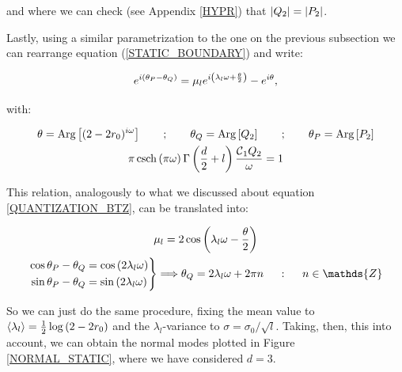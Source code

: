 \documentclass[11pt,a4paper]{article}
\begin{document}
{{\noindent and where we can check (see Appendix \ref{HYPR}) that $\left| Q_2 \right|=\left| P_2 \right|$. }

Lastly, using a similar parametrization to the one on the previous subsection we can rearrange equation (\ref{STATIC_BOUNDARY}) and write:

\begin{equation}
    e^{i(\theta_P-\theta_Q)} = \mu_l e^{i\left(\lambda_l\omega + \frac{\theta}{2}\right)}-e^{i\theta},
\end{equation}

{\noindent with:}

\begin{equation}
    \begin{gathered}
        \theta=\text{Arg}\left[(2-2r_0)^{i\omega}\right] ~~~~~~;~~~~~~ \theta_Q=\text{Arg}\left[Q_2\right] ~~~~~~;~~~~~~ \theta_P=\text{Arg}\left[P_2\right]\\
        \pi \operatorname{csch}\left(\pi\omega\right)\Gamma\left(\frac{d}{2}+l\right) \frac{\mbox{${\cal C}$}_1Q_2}{\omega} = 1
    \end{gathered}
\end{equation}

This relation, analogously to what we discussed about equation \ref{QUANTIZATION_BTZ}, can be translated into:

\begin{equation}
    \begin{gathered}
        \mu_l = 2\cos\left(\lambda_l\w - \frac{\theta}{2}\right)\\
        \left.\begin{aligned}
            \cos{\theta_P-\theta_Q} &= \cos{\left(2\lambda_l\w\right)}\\
            \sin{\theta_P-\theta_Q} &= \sin{\left(2\lambda_l\w\right)}
        \end{aligned}\right\}\Longrightarrow \theta_Q = 2\lambda_l\omega +2\pi n ~~~~:~~~~ n\in\mathds{Z}
    \end{gathered}
\end{equation}

{\noindent So we can just do the same procedure, fixing the mean value to $\langle\lambda_l\rangle = \frac{1}{2}\log\left(2-2r_0\right)$ and the $\lambda_l$-variance to $\sigma=\sigma_0/\sqrt{l}$. Taking, then, this into account, we can obtain the normal modes plotted in Figure \ref{NORMAL_STATIC}, where we have considered $d=3$.}

}
\end{document}
